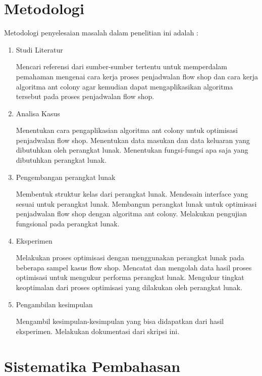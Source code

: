 \section{Metodologi}
\label{sec:metlit}

Metodologi penyelesaian masalah dalam penelitian ini adalah :
\begin{enumerate}
	\item Studi Literatur
	
	Mencari referensi dari sumber-sumber tertentu untuk memperdalam pemahaman mengenai
	cara kerja proses penjadwalan flow shop dan cara kerja algoritma ant colony agar
	kemudian dapat mengaplikasikan algoritma tersebut pada proses penjadwalan flow shop.
	
	\item Analisa Kasus
	
	Menentukan cara pengaplikasian algoritma ant colony untuk optimisasi penjadwalan flow shop. Menentukan data masukan dan data keluaran yang dibutuhkan oleh perangkat
	lunak. Menentukan fungsi-fungsi apa saja yang dibutuhkan perangkat lunak.
	
	\item Pengembangan perangkat lunak
	
	Membentuk struktur kelas dari perangkat lunak. Mendesain interface yang sesuai untuk perangkat lunak. Membangun perangkat lunak untuk optimisasi penjadwalan flow shop dengan algoritma ant colony. Melakukan pengujian fungsional pada perangkat lunak.
	
	\item Eksperimen
	
	Melakukan proses optimisasi dengan menggunakan perangkat lunak pada beberapa sampel	kasus flow shop. Mencatat dan mengolah data hasil proses optimisasi untuk mengukur performa perangkat lunak. Mengukur tingkat keoptimalan dari proses optimisasi yang
	dilakukan oleh perangkat lunak.
	
	\item Pengambilan kesimpulan
	
	Mengambil kesimpulan-kesimpulan yang bisa didapatkan dari hasil eksperimen. Melakukan
	dokumentasi dari skripsi ini.
	
\end{enumerate}


\section{Sistematika Pembahasan}
\label{sec:sispem}


